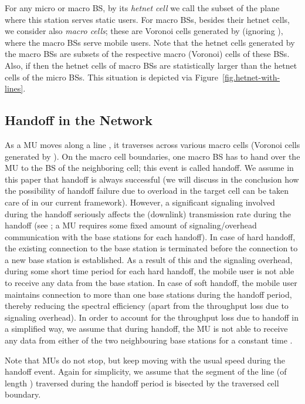 \documentclass[10pt,journal]{IEEEtran}
\begin{document}
For any micro or macro BS, by its {\em hetnet cell} we call  the subset of the plane where this station serves static users.
For macro BSs, besides their  hetnet cells, we consider also {\em macro cells}; these are Voronoi cells generated by  
(ignoring ), where the macro BSs serve mobile users. Note that the hetnet cells generated by  the macro BSs are subsets of the respective macro (Voronoi) cells of these BSs. Also, if 
 then the hetnet cells of macro BSs are statistically larger than the hetnet cells of the micro BSs.
This situation is depicted via Figure~\ref{fig.hetnet-with-lines}.




\subsection{Handoff in the Network}\label{subsection:handoff-model}
As a MU moves along a line , it traverses across various macro cells 
(Voronoi cells generated by ).
On the macro cell boundaries, one macro BS has to hand over the MU to the BS of the neighboring cell;
this event is called handoff. We assume in this paper that handoff is always successful (we will discuss in the conclusion 
how the possibility of handoff failure due to overload in the target cell 
can be taken care of in our current framework). However, 
a significant signaling involved 
during the handoff seriously affects the (downlink) transmission rate during the handoff (see 
\cite[Section~]{kavitha-etal11spatial-queueing-picocells}; a MU requires some fixed amount of signaling/overhead 
communication with the base stations 
for each handoff). In case of hard handoff, the existing connection to the base station is terminated before the connection 
to a new base station is established. As a result of this and the signaling overhead, during 
some short time period for each hard handoff, 
the mobile user is not able to receive any data from the base station. In case of soft handoff, 
the mobile user maintains connection to more than one base stations during the 
handoff period, thereby reducing the spectral efficiency (apart 
from the throughput loss due to signaling overhead). 
In order to account for the throughput loss due to handoff in a simplified way,  we assume that
during handoff, 
the MU is not able to receive any data from either of the two neighbouring  base stations for a constant time .

Note that MUs do not stop, but keep moving with the usual speed   during 
the handoff event. Again for simplicity, we assume that the segment of the line   (of length ) traversed during the handoff period 
is bisected by the traversed cell boundary.
\end{document}

